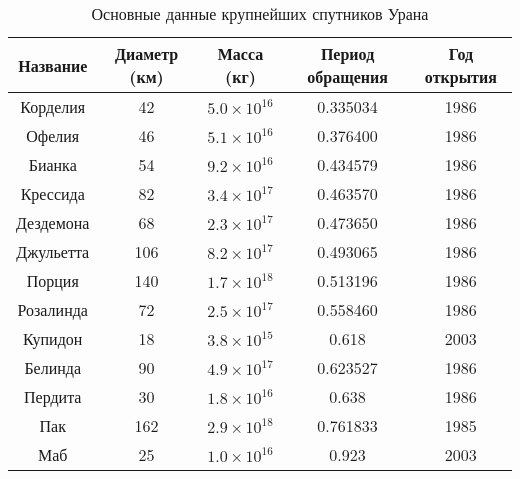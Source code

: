 \documentclass[30pt]{article}
\begin{document}
        \begin{table}[h!]
            \begin{tabularx}{\textwidth}{
        |C{0.15}|C{0.24}|C{0.2}|C{0.22}|C{0.17}| }
                \hline
                \textbf{Название} & \textbf{Диаметр (км)} & \textbf{Масса (кг)} & \bfseries{Период обращения} & \bfseries{Год открытия}\\
                \hline 
                Корделия & 42 & $5.0\times10^{16}$ & 0.335034 & 1986 \\
                \hline
                Офелия & 46 & $5.1\times10^{16}$ & 0.376400 & 1986 \\
                \hline
                Бианка & 54 & $9.2\times10^{16}$ & 0.434579 & 1986 \\
                \hline
                Крессида & 82 & $3.4\times10^{17}$ & 0.463570 & 1986 \\
                \hline
                Дездемона & 68 & $2.3\times10^{17}$ & 0.473650 & 1986 \\
                \hline
                Джульетта & 106 & $8.2\times10^{17}$ & 0.493065 & 1986 \\
                \hline
                Порция & 140 & $1.7\times10^{18}$ & 0.513196 & 1986 \\
                \hline
                Розалинда & 72 & $2.5\times10^{17}$ & 0.558460 & 1986 \\
                \hline
                Купидон & 18 & $3.8\times10^15$ & 0.618 & 2003 \\
                \hline
                Белинда & 90 & $4.9\times10^{17}$ & 0.623527 & 1986 \\
                \hline
                Пердита & 30 & $1.8\times10^{16}$ & 0.638 & 1986 \\
                \hline
                Пак & 162 & $2.9\times10^{18}$ & 0.761833 & 1985 \\
                \hline
                Маб & 25 & $1.0\times10^{16}$ & 0.923 & 2003 \\
                \hline
            \end{tabularx}
            \caption{Основные данные крупнейших спутников Урана\label{tbl:moons}}
        \end{table}
\end{document}
